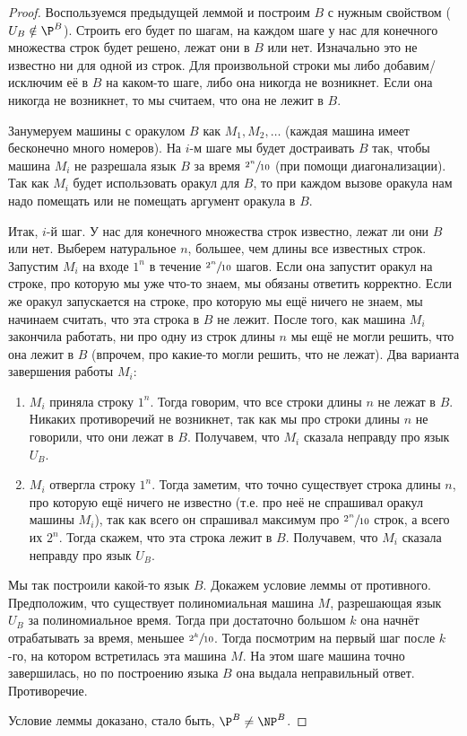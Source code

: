 	\begin{proof}
		Воспользуемся предыдущей леммой и построим $B$ с нужным свойством ($U_B \notin \P^B$).
		Строить его будет по шагам, на каждом шаге у нас для конечного множества строк будет решено, лежат они в $B$ или нет.
		Изначально это не известно ни для одной из строк.
		Для произвольной строки мы либо добавим/исключим её в $B$ на каком-то шаге, либо она никогда не возникнет.
		Если она никогда не возникнет, то мы считаем, что она не лежит в $B$.

		Занумеруем машины с оракулом $B$ как $M_1, M_2, \dots$ (каждая машина имеет бесконечно много номеров).
		На $i$-м шаге мы будет достраивать $B$ так, чтобы машина $M_i$ не разрешала язык $B$ за время $\sfrac{2^n}{10}$ (при помощи диагонализации).
		Так как $M_i$ будет использовать оракул для $B$, то при каждом вызове оракула нам надо помещать или не помещать аргумент оракула в $B$.

		Итак, $i$-й шаг.
		У нас для конечного множества строк известно, лежат ли они $B$ или нет.
		Выберем натуральное $n$, большее, чем длины все известных строк.
		Запустим $M_i$ на входе $1^n$ в течение $\sfrac{2^n}{10}$ шагов.
		Если она запустит оракул на строке, про которую мы уже что-то знаем, мы обязаны ответить корректно.
		Если же оракул запускается на строке, про которую мы ещё ничего не знаем, мы начинаем считать, что эта строка в $B$ не лежит.
		После того, как машина $M_i$ закончила работать, ни про одну из строк длины $n$ мы ещё не могли решить, что она лежит в $B$
		(впрочем, про какие-то могли решить, что не лежат).
		Два варианта завершения работы $M_i$:
		\begin{enumerate}
			\item
				$M_i$ приняла строку $1^n$.
				Тогда говорим, что все строки длины $n$ не лежат в $B$.
				Никаких противоречий не возникнет, так как мы про строки длины $n$ не говорили, что они лежат в $B$.
				Получавем, что $M_i$ сказала неправду про язык $U_B$.
			\item
				$M_i$ отвергла строку $1^n$.
				Тогда заметим, что точно существует строка длины $n$, про которую ещё ничего не известно (т.е. про неё не спрашивал оракул машины $M_i$),
				так как всего он спрашивал максимум про $\sfrac{2^n}{10}$ строк, а всего их $2^n$.
				Тогда скажем, что эта строка лежит в $B$.
				Получавем, что $M_i$ сказала неправду про язык $U_B$.
		\end{enumerate}

		Мы так построили какой-то язык $B$.
		Докажем условие леммы от противного.
		Предположим, что существует полиномиальная машина $M$, разрешающая язык $U_B$ за полиномиальное время.
		Тогда при достаточно большом $k$ она начнёт отрабатывать за время, меньшее $\sfrac{2^k}{10}$.
		Тогда посмотрим на первый шаг после $k$-го, на котором встретилась эта машина $M$.
		На этом шаге машина точно завершилась, но по построению языка $B$ она выдала неправильный ответ.
		Противоречие.

		Условие леммы доказано, стало быть, $\P^B \neq \NP^B$.
	\end{proof}
